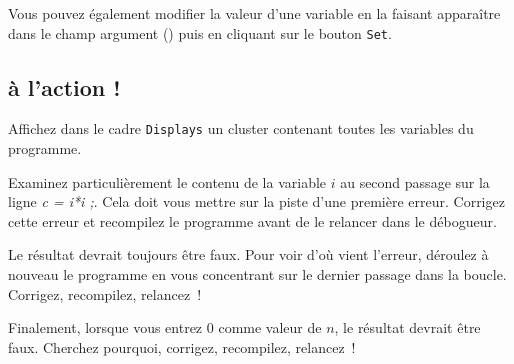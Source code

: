 \documentclass[12pt,a4paper]{article}
\begin{document}
Vous pouvez également modifier la valeur d'une variable
en la faisant apparaître dans le champ argument () puis en cliquant
sur le bouton {\tt Set}.


\subsection{à l'action !}

Affichez dans le cadre \texttt{Displays} un cluster contenant toutes
les variables du programme. 

Examinez particulièrement le contenu de la variable $i$ au second
passage sur la ligne \textit{c = i*i ;}. Cela doit vous mettre sur la
piste d'une première erreur. Corrigez cette erreur et recompilez le
programme avant de le relancer dans le débogueur.

Le résultat devrait toujours être faux. Pour voir d'où vient l'erreur,
déroulez à nouveau le programme en vous concentrant sur le dernier
passage dans la boucle. Corrigez, recompilez, relancez~!

Finalement, lorsque vous entrez $0$ comme valeur de $n$, le résultat
devrait être faux. Cherchez pourquoi, corrigez, recompilez, relancez~!






% 




\end{document}
